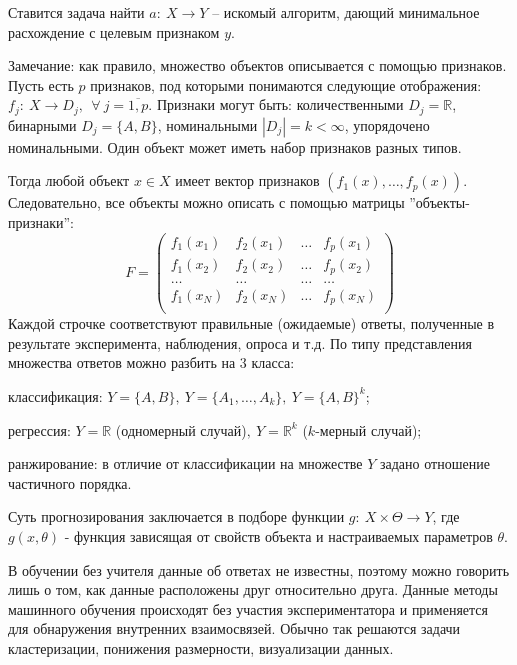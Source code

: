 Ставится задача найти $a:~X \rightarrow Y$ -- искомый алгоритм, дающий минимальное расхождение с целевым признаком $y$.

Замечание: как правило, множество объектов описывается с помощью признаков. Пусть есть $p$ признаков, под которыми понимаются следующие отображения: $f_j:~X \rightarrow D_j,~~\forall~j=\overline{1,p}$.
Признаки могут быть: количественными $D_j=\mathbb{R}$, бинарными $D_j=\{A, B\}$, номинальными $|D_j|=k<\infty$, упорядочено номинальными. Один объект может иметь набор признаков разных типов.

Тогда любой объект $x \in X$ имеет вектор признаков $(f_1(x), \dots, f_p(x))$.
Следовательно, все объекты можно описать с помощью матрицы ''объекты-признаки'':
$$ F = 
\begin{pmatrix}
f_1(x_1) & f_2(x_1) & \dots & f_p(x_1) \\
f_1(x_2) & f_2(x_2) & \dots & f_p(x_2) \\
\dots    & \dots    & \dots & \dots    \\
f_1(x_N) & f_2(x_N) & \dots & f_p(x_N) \\
\end{pmatrix}
$$
Каждой строчке соответствуют правильные (ожидаемые) ответы, полученные в результате эксперимента, наблюдения, опроса и т.д. По типу представления множества ответов можно разбить на 3 класса:
\begin{description}[font=$\bullet$]
    \item классификация: $Y=\{A,B\},~Y=\{A_1,\dots,A_k\},~Y=\{A,B\}^k$;
    \item регрессия: $Y=\mathbb{R}$ (одномерный случай)$,~Y=\mathbb{R}^k$ ($k$-мерный случай);
    \item ранжирование: в отличие от классификации на множестве $Y$ задано отношение частичного порядка.
\end{description}


Суть прогнозирования заключается в подборе функции $g:~X \times \Theta \rightarrow Y$, где $g(x,\theta)$ - функция зависящая от свойств объекта и настраиваемых параметров $\theta$.



В обучении без учителя данные об ответах не известны, поэтому можно говорить лишь о том, как данные расположены друг относительно друга. Данные методы машинного обучения происходят без участия экспериментатора и применяется для обнаружения внутренних взаимосвязей. Обычно так решаются задачи кластеризации, понижения размерности, визуализации данных.

